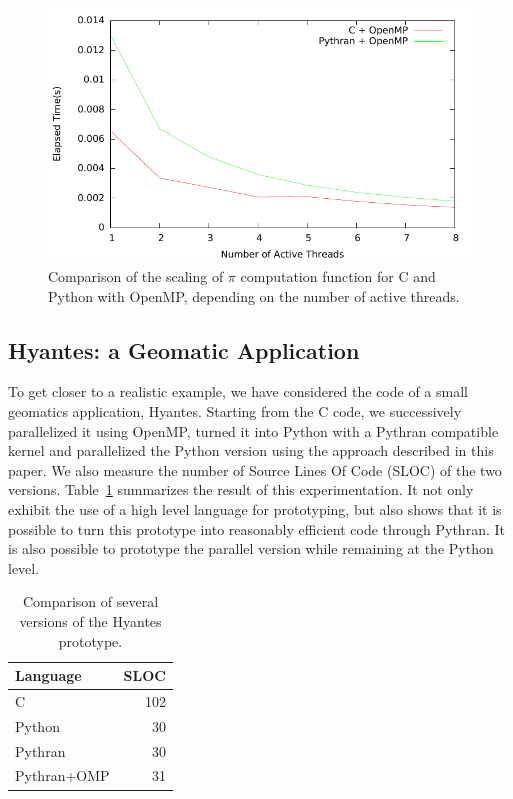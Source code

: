 \documentclass[conference]{IEEEtran}
\begin{document}
\begin{figure}

    \caption{Comparison of the scaling of $\pi$ computation function for C and
    Python with OpenMP, depending on the number of active threads.}
    \label{fig:motivating-example-scale}

    \includegraphics[width=.5\textwidth]{pi_omp_bench.pdf}

\end{figure}


\subsection{Hyantes: a Geomatic Application}

To get closer to a realistic example, we have considered the code of a small
geomatics application, Hyantes. Starting from the C code, we successively
parallelized it using OpenMP, turned it into Python with a Pythran compatible
kernel and parallelized the Python version using the approach described in this
paper. We also measure the number of Source Lines Of Code (SLOC) of the two
versions.  Table~\ref{tbl:hyantes} summarizes the result of this
experimentation. It not only exhibit the use of a high level language
for prototyping, but also shows that it is possible to
turn this prototype into reasonably efficient code through Pythran. It is also
possible to prototype the parallel version while remaining at the Python level.

\begin{table}

    \caption{Comparison of several versions of the Hyantes prototype.}
    \label{tbl:hyantes}

    \centering
    \begin{tabular}{|l|r|}
        \hline
        Language & SLOC     \\
        \hline
        C       & 102       \\
        Python  & 30        \\
        Pythran & 30        \\
        Pythran+OMP    & 31 \\
        \hline
    \end{tabular}

\end{table}
\end{document}
